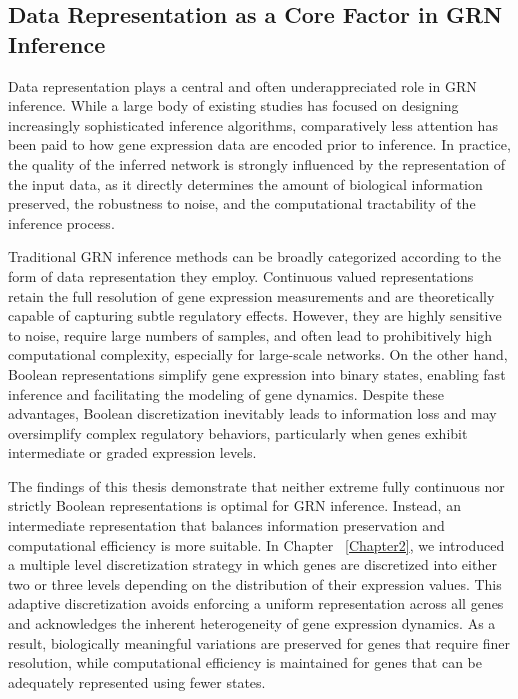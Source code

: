 \subsection{Data Representation as a Core Factor in GRN Inference}

Data representation plays a central and often underappreciated role in GRN inference. While a large body of existing studies has focused on designing increasingly sophisticated inference algorithms, comparatively less attention has been paid to how gene expression data are encoded prior to inference. In practice, the quality of the inferred network is strongly influenced by the representation of the input data, as it directly determines the amount of biological information preserved, the robustness to noise, and the computational tractability of the inference process.

Traditional GRN inference methods can be broadly categorized according to the form of data representation they employ. Continuous valued representations retain the full resolution of gene expression measurements and are theoretically capable of capturing subtle regulatory effects. However, they are highly sensitive to noise, require large numbers of samples, and often lead to prohibitively high computational complexity, especially for large-scale networks. On the other hand, Boolean representations simplify gene expression into binary states, enabling fast inference and facilitating the modeling of gene dynamics. Despite these advantages, Boolean discretization inevitably leads to information loss and may oversimplify complex regulatory behaviors, particularly when genes exhibit intermediate or graded expression levels.

The findings of this thesis demonstrate that neither extreme fully continuous nor strictly Boolean representations is optimal for GRN inference. Instead, an intermediate representation that balances information preservation and computational efficiency is more suitable. In Chapter ~\ref{Chapter2}, we introduced a multiple level discretization strategy in which genes are discretized into either two or three levels depending on the distribution of their expression values. This adaptive discretization avoids enforcing a uniform representation across all genes and acknowledges the inherent heterogeneity of gene expression dynamics. As a result, biologically meaningful variations are preserved for genes that require finer resolution, while computational efficiency is maintained for genes that can be adequately represented using fewer states.

